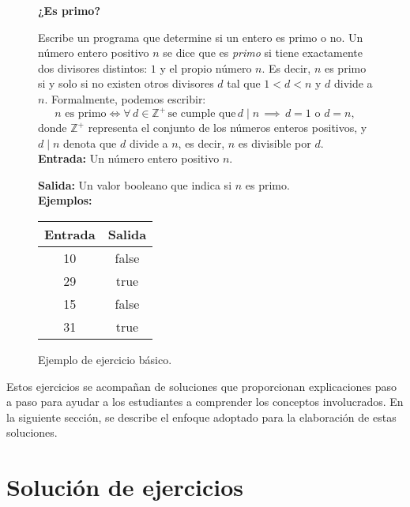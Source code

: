 \begin{figure}[h!]
    \centering
    \begin{minipage}{12cm}
    \begin{framed}
        \textbf{¿Es primo?}

        Escribe un programa que determine si un entero es primo o no. Un número entero positivo \( n \) se dice que es \textit{primo} si tiene exactamente dos divisores distintos: \( 1 \) y el propio número \( n \). Es decir, \( n \) es primo si y solo si no existen otros divisores \( d \) tal que \( 1 < d < n \) y \( d \) divide a \( n \). Formalmente, podemos escribir:
        \[
        n \text{ es primo} \iff  \forall \, d \in \mathbb{Z}^+ \, \text{se cumple que} \, d \mid n \, \implies \, d = 1 \text{ o } d = n,
        \]
        donde \( \mathbb{Z}^+ \) representa el conjunto de los números enteros positivos, y \( d \mid n \) denota que \( d \) divide a \( n \), es decir, \( n \) es divisible por \( d \).\\
        
        \textbf{Entrada:} Un número entero positivo \( n \). 
        
        \textbf{Salida:} Un valor booleano que indica si \( n \) es primo.\\
        
        \textbf{Ejemplos:}

        \centering
        \begin{tabular}{|c|c|}
        \hline
        Entrada & Salida \\
        \hline
        10      & false  \\
        29      & true   \\
        15      & false  \\
        31      & true   \\
        \hline
        \end{tabular}
    \end{framed}
    \end{minipage}
\caption{Ejemplo de ejercicio básico.}\label{fig:basic}
\end{figure}

Estos ejercicios se acompañan de soluciones que proporcionan explicaciones paso a paso para ayudar a los estudiantes a comprender los conceptos involucrados. En la siguiente sección, se describe el enfoque adoptado para la elaboración de estas soluciones.

\section{Solución de ejercicios}

